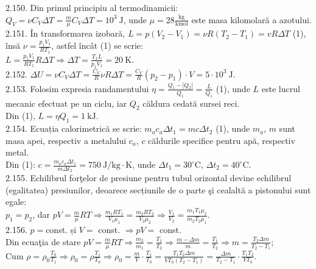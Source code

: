 2.150. Din primul principiu al termodinamicii:\\ $Q_{V}=\nu C_{V} \Delta T=\frac{m}{\mu} C_{V} \Delta T=10^{3} \mathrm{~J}$, unde $\mu=28 \frac{\mathrm{kg}}{\mathrm{kmol}}$ este masa kilomolară a azotului.\\

2.151. În transformarea izobară, $L=p\left(V_{2}-V_{1}\right)=\nu R\left(T_{2}-T_{1}\right)=v R \Delta T$ (1), însă $\nu=\frac{p_{1} V_{1}}{R T_{1}}$, astfel încât (1) se scrie:\\ $L=\frac{p_{1} V_{1}}{R T_{1}} R \Delta T \Rightarrow \Delta T=\frac{T_{1} L}{p_{1} V_{1}}=20 \mathrm{~K}$.\\

2.152. $\Delta U=\nu C_{V} \Delta T=\frac{C_{V}}{R} \nu R \Delta T=\frac{C_{V}}{R}\left(p_{2}-p_{1}\right) \cdot V=5 \cdot 10^{3} \mathrm{~J}$.\\

2.153. Folosim expresia randamentului $\eta=\frac{Q_{1}-\left|Q_{2}\right|}{Q_{1}}=\frac{L}{Q_{1}}$ (1), unde $L$ este lucrul mecanic efectuat pe un ciclu, iar $Q_{2}$ căldura cedată sursei reci.\\ Din (1), $L=\eta Q_{1}=1 \mathrm{~kJ}$.\\

2.154. Ecuația calorimetrică se scrie: $m_{a} c_{a} \Delta t_{1}=m c \Delta t_{2}$ (1), unde $m_{a}$, $m$ sunt masa apei, respectiv a metalului $c_{a}$, $c$ căldurile specifice pentru apă, respectiv metal.\\ Din (1): $c=\frac{m_{a} c_{a} \Delta t_{1}}{m \Delta t_{2}}=750 \mathrm{~J} / \mathrm{kg} \cdot \mathrm{K}$, unde $\Delta t_{1}=30^{\circ} \mathrm{C}$, $\Delta t_{2}=40^{\circ} \mathrm{C}$.\\

2.155. Echilibrul forţelor de presiune pentru tubul orizontal devine echilibrul (egalitatea) presiunilor, deoarece secțiunile de o parte şi cealaltă a pistonului sunt egale:\\ $p_{1}=p_{2}$, dar $p V=\frac{m}{\mu} R T \Rightarrow \frac{m_{1} R T_{1}}{V_{1} \mu_{1}}=\frac{m_{2} R T_{2}}{V_{2} \mu_{2}} \Rightarrow \frac{V_{1}}{V_{2}}=\frac{m_{1} T_{1} \mu_{2}}{m_{2} T_{2} \mu_{1}}$.\\

2.156. $p=$const. și $V=$ const. $\Rightarrow p V=$ const.\\ Din ecuaţia de stare $p V=\frac{m}{\mu} R T \Rightarrow \frac{m_{2}}{m_{1}}=\frac{T_{1}}{T_{2}} \Rightarrow \frac{m-\Delta m}{m}=\frac{T_{1}}{T_{2}} \Rightarrow m=\frac{T_{2} \Delta m}{T_{2}-T_{1}}$;\\ Cum $\rho=\rho_{0} \frac{T_{0}}{T_{1}} \Rightarrow \rho_{0}=\rho \frac{T_{1}}{T_{0}} \Rightarrow \rho_{0}=\frac{m}{V} \cdot \frac{T_{1}}{T_{0}}=\frac{T_{1} T_{2} \Delta m}{V T_{0}\left(T_{2}-T_{1}\right)}=\frac{\Delta m}{T_{2}-T_{1}} \cdot \frac{T_{1} T_{2}}{V T_{0}}$.\\

